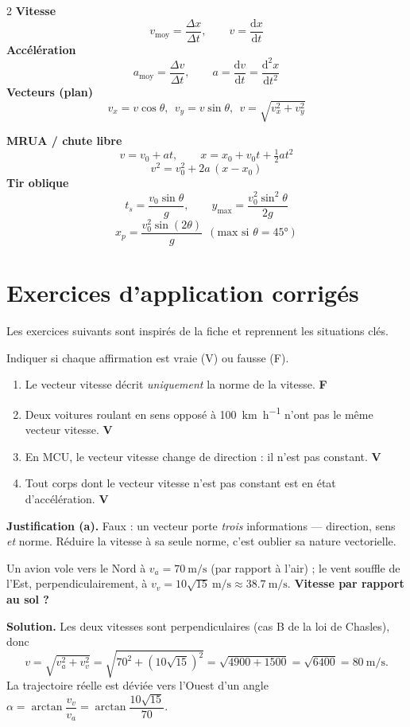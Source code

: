 \documentclass[11pt,a4paper]{article}
\newcommand{\dd}{\mathrm{d}}
\begin{document}
\begin{multicols}{2}
\noindent\textbf{Vitesse}
\[ v_{\text{moy}}=\frac{\Delta x}{\Delta t},\qquad v=\frac{\dd x}{\dd t} \]
\textbf{Accélération}
\[ a_{\text{moy}}=\frac{\Delta v}{\Delta t},\qquad a=\frac{\dd v}{\dd t}=\frac{\dd^2x}{\dd t^2} \]
\textbf{Vecteurs (plan)}
\[ v_x=v\cos\theta,\ \ v_y=v\sin\theta,\ \ v=\sqrt{v_x^2+v_y^2} \]

\columnbreak
\noindent\textbf{MRUA / chute libre}
\[ v=v_0+at,\qquad x=x_0+v_0t+\tfrac12 a t^2 \]
\[ v^2=v_0^2+2a\,(x-x_0) \]
\textbf{Tir oblique}
\[ t_s=\frac{v_0\sin\theta}{g},\qquad y_{\max}=\frac{v_0^2\sin^2\theta}{2g} \]
\[ x_p=\frac{v_0^2\sin(2\theta)}{g}\ \ (\text{max si }\theta=\ang{45}) \]
\end{multicols}

\section{Exercices d'application corrigés}
Les exercices suivants sont inspirés de la fiche et reprennent les situations clés.

\begin{exemple}
Indiquer si chaque affirmation est vraie (V) ou fausse (F).
\begin{enumerate}[leftmargin=1.8em,label=\textbf{\alph*.}]
  \item Le vecteur vitesse décrit \emph{uniquement} la norme de la vitesse. \hfill \textbf{F}
  \item Deux voitures roulant en sens opposé à \qty{100}{\kilo\metre\per\hour} n'ont pas le même vecteur vitesse. \hfill \textbf{V}
  \item En MCU, le vecteur vitesse change de direction : il n'est pas constant. \hfill \textbf{V}
  \item Tout corps dont le vecteur vitesse n'est pas constant est en état d'accélération. \hfill \textbf{V}
\end{enumerate}
\textbf{Justification (a).} Faux : un vecteur porte \emph{trois} informations — direction, sens \emph{et}
norme. Réduire la vitesse à sa seule norme, c'est oublier sa nature vectorielle.
\end{exemple}

\begin{exemple}
Un avion vole vers le Nord à $v_a=\qty{70}{\metre\per\second}$ (par rapport à l'air) ;
le vent souffle de l'Est, perpendiculairement, à $v_v=10\sqrt{15}\ \si{\metre\per\second}\approx\qty{38,7}{\metre\per\second}$.
\textbf{Vitesse par rapport au sol ?}

\textbf{Solution.} Les deux vitesses sont perpendiculaires (cas B de la loi de Chasles), donc
\[ v=\sqrt{v_a^2+v_v^2}=\sqrt{70^2+(10\sqrt{15})^2}=\sqrt{4900+1500}=\sqrt{6400}=\qty{80}{\metre\per\second}. \]
La trajectoire réelle est déviée vers l'Ouest d'un angle
$\alpha=\arctan\!\dfrac{v_v}{v_a}=\arctan\!\dfrac{10\sqrt{15}}{70}$.
\end{exemple}
\end{document}
